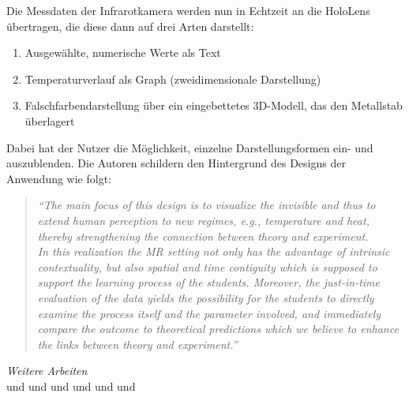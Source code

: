 Die Messdaten der Infrarotkamera werden nun in Echtzeit an die HoloLens übertragen, die diese dann auf drei Arten darstellt:
\begin{enumerate}
	\setlength{\itemsep}{-2pt}
	\item Ausgewählte, numerische Werte als Text
	\item Temperaturverlauf als Graph (zweidimensionale Darstellung)
	\item Falschfarbendarstellung über ein eingebettetes 3D-Modell, das den Metallstab überlagert
\end{enumerate}
Dabei hat der Nutzer die Möglichkeit, einzelne Darstellungsformen ein- und auszublenden. Die Autoren schildern den Hintergrund des Designs der Anwendung wie folgt:
\begin{quote}
	\textit{``The main focus of this design is to visualize the invisible and thus to extend human perception to new regimes, e.g., temperature and heat, thereby strengthening the connection between theory and experiment.\\ 
	In this realization the MR setting not only has the advantage of intrinsic contextuality, but also spatial and time contiguity which is supposed to support the learning process of the students. Moreover, the just-in-time evaluation of the data yields the possibility for the students to directly examine the process itself and the parameter involved, and immediately compare the outcome to theoretical predictions which we believe to enhance the links between theory and experiment.''}
\end{quote}

\vspace{4px}
\textit{Weitere Arbeiten}\\
\cite{Amiraslanov18} und \cite{Javaheri18} und \cite{Matsutomo13} und \cite{Mannuss11} und \cite{Jerry10} und \cite{Kaufmann08} und \cite{Techakosit15}

